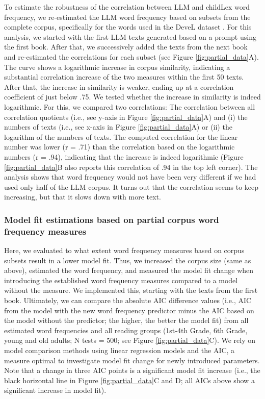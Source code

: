 \documentclass[doc, a4paper]{apa7}
\begin{document}
To estimate the robustness of the correlation between LLM and childLex word frequency, we re-estimated the LLM word frequency based on subsets from the complete corpus, specifically for the words used in the DeveL dataset \citep{schroter_developmental_2017}. For this analysis, we started with the first LLM texts generated based on a prompt using the first book. After that, we successively added the texts from the next book and re-estimated the correlations for each subset (see Figure \ref{fig:partial_data}A). The curve shows a logarithmic increase in corpus similarity, indicating a substantial correlation increase of the two measures within the first 50 texts. After that, the increase in similarity is weaker, ending up at a correlation coefficient of just below .75. We tested whether the increase in similarity is indeed logarithmic. For this, we compared two correlations: The correlation between all correlation quotients (i.e., see y-axis in Figure \ref{fig:partial_data}A) and (i) the numbers of texts (i.e., see x-axis in Figure \ref{fig:partial_data}A) or (ii) the logarithm of the numbers of texts. The computed correlation for the linear number was lower (r = .71) than the correlation based on the logarithmic numbers (r = .94), indicating that the increase is indeed logarithmic  (Figure \ref{fig:partial_data}B also reports this correlation of .94 in the top left corner). The analysis shows that word frequency would not have been very different if we had used only half of the LLM corpus. It turns out that the correlation seems to keep increasing, but that it slows down with more text. 


\subsubsection{Model fit estimations based on partial corpus word frequency measures}

Here, we evaluated to what extent word frequency measures based on corpus subsets result in a lower model fit. Thus, we increased the corpus size (same as above), estimated the word frequency, and measured the model fit change when introducing the established word frequency measures compared to a model without the measure. We implemented this, starting with the texts from the first book. Ultimately, we can compare the absolute AIC difference values (i.e., AIC from the model with the new word frequency predictor minus the AIC based on the model without the predictor; the higher, the better the model fit) from all estimated word frequencies and all reading groups (1st-4th Grade, 6th Grade, young and old adults; N tests = 500; see Figure \ref{fig:partial_data}C). We rely on model comparison methods using linear regression models and the AIC, a measure optimal to investigate model fit change for newly introduced parameters. Note that a change in three AIC points is a significant model fit increase (i.e., the black horizontal line in Figure \ref{fig:partial_data}C and D; all AICs above show a significant increase in model fit).
\end{document}
